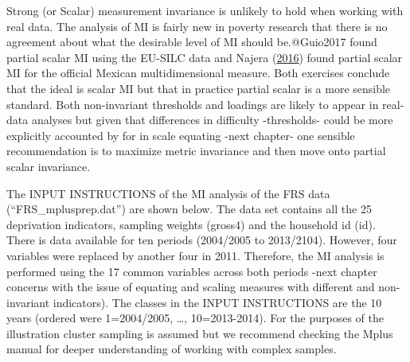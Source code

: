 \documentclass[]{book}
\begin{document}
Strong (or Scalar) measurement invariance is unlikely to hold when working with real data. The analysis of MI is fairly new in poverty research that there is no agreement about what the desirable level of MI should be.@Guio2017 found partial scalar MI using the EU-SILC data and Najera (\protect\hyperlink{ref-Najera2016}{2016}) found partial scalar MI for the official Mexican multidimensional measure. Both exercises conclude that the ideal is scalar MI but that in practice partial scalar is a more sensible standard. Both non-invariant thresholds and loadings are likely to appear in real-data analyses but given that differences in difficulty -thresholds- could be more explicitly accounted by for in scale equating -next chapter- one sensible recommendation is to maximize metric invariance and then move onto partial scalar invariance.

The INPUT INSTRUCTIONS of the MI analysis of the FRS data (``FRS\_mplusprep.dat'') are shown below. The data set contains all the 25 deprivation indicators, sampling weights (gross4) and the household id (id). There is data available for ten periods (2004/2005 to 2013/2104). However, four variables were replaced by another four in 2011. Therefore, the MI analysis is performed using the 17 common variables across both periods -next chapter concerns with the issue of equating and scaling measures with different and non-invariant indicators). The classes in the INPUT INSTRUCTIONS are the 10 years (ordered were 1=2004/2005, \ldots, 10=2013-2014). For the purposes of the illustration cluster sampling is assumed but we recommend checking the Mplus manual for deeper understanding of working with complex samples.
\end{document}
